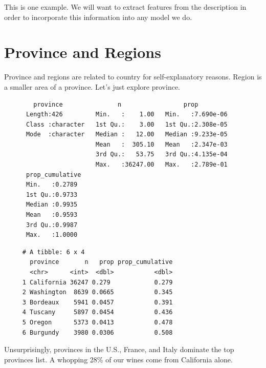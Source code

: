 \documentclass[12pt,twoside]{amherstthesis}
\newenvironment{Shaded}{\begin{snugshade}}{\end{snugshade}}
\newcommand{\KeywordTok}[1]{\textcolor[rgb]{0.13,0.29,0.53}{\textbf{#1}}}
\newcommand{\DataTypeTok}[1]{\textcolor[rgb]{0.13,0.29,0.53}{#1}}
\newcommand{\StringTok}[1]{\textcolor[rgb]{0.31,0.60,0.02}{#1}}
\newcommand{\OtherTok}[1]{\textcolor[rgb]{0.56,0.35,0.01}{#1}}
\newcommand{\OperatorTok}[1]{\textcolor[rgb]{0.81,0.36,0.00}{\textbf{#1}}}
\newcommand{\NormalTok}[1]{#1}
\begin{document}
This is one example. We will want to extract features from the
description in order to incorporate this information into any model we
do.

\section{Province and Regions}\label{province-and-regions}

Province and regions are related to country for self-explanatory
reasons. Region is a smaller area of a province. Let's just explore
province.
\begin{Shaded}
\end{Shaded}
\begin{verbatim}
        province               n                 prop          
      Length:426         Min.   :    1.00   Min.   :7.690e-06  
      Class :character   1st Qu.:    3.00   1st Qu.:2.308e-05  
      Mode  :character   Median :   12.00   Median :9.233e-05  
                         Mean   :  305.10   Mean   :2.347e-03  
                         3rd Qu.:   53.75   3rd Qu.:4.135e-04  
                         Max.   :36247.00   Max.   :2.789e-01  
      prop_cumulative 
      Min.   :0.2789  
      1st Qu.:0.9733  
      Median :0.9935  
      Mean   :0.9593  
      3rd Qu.:0.9987  
      Max.   :1.0000
\end{verbatim}
\begin{Shaded}
\end{Shaded}
\begin{verbatim}
     # A tibble: 6 x 4
       province       n   prop prop_cumulative
       <chr>      <int>  <dbl>           <dbl>
     1 California 36247 0.279            0.279
     2 Washington  8639 0.0665           0.345
     3 Bordeaux    5941 0.0457           0.391
     4 Tuscany     5897 0.0454           0.436
     5 Oregon      5373 0.0413           0.478
     6 Burgundy    3980 0.0306           0.508
\end{verbatim}
Unsurprisingly, provinces in the U.S., France, and Italy dominate the
top provinces list. A whopping 28\% of our wines come from California
alone.
\end{document}
